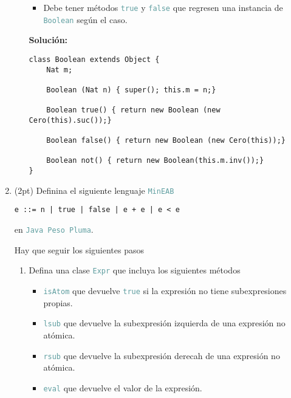 \documentclass{article}
\newcommand{\tp}[1]{\textcolor{CadetBlue} {\texttt{#1}}}
\newcommand{\tb}[1]{\textcolor{RoyalPurple} {\textbf{#1}}}
\newcommand{\pt}[1]{\textcolor{RoyalPurple}{(#1pt)}}
\begin{document}
\begin{enumerate}
\begin{enumerate}
\begin{itemize}
                \item Debe tener métodos \tp{true} y \tp{false} que regresen una
                instancia de \tp{Boolean} según el caso.
            \end{itemize}

            \tb{Solución:}
            \begin{verbatim}
class Boolean extends Object {
    Nat m;

    Boolean (Nat n) { super(); this.m = n;}

    Boolean true() { return new Boolean (new Cero(this).suc());}

    Boolean false() { return new Boolean (new Cero(this));}

    Boolean not() { return new Boolean(this.m.inv());}
}
            \end{verbatim}
        \end{enumerate}

        \item \pt{2} Definina el siguiente lenguaje \tp{MinEAB}

        \begin{verbatim}
e ::= n | true | false | e + e | e < e
        \end{verbatim}

        en \tp{Java Peso Pluma}.

        Hay que seguir los siguientes pasos

        \begin{enumerate}
            \item Defina una clase \tp{Expr} que incluya los siguientes métodos

            \begin{itemize}
                \item \tp{isAtom} que devuelve \tp{true} si la expresión no
                tiene subexpresiones propias.

                \item \tp{lsub} que devuelve la subexpresión izquierda de una
                expresión no atómica.

                \item \tp{rsub} que devuelve la subexpresión derecah de una
                expresión no atómica.

                \item \tp{eval} que devuelve el valor de la expresión.
            \end{itemize}


\end{enumerate}
\end{enumerate}
\end{document}
